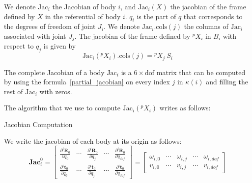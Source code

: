 We denote $\text{Jac}_i$ the Jacobian of body $i$, and $\text{Jac}_i(X)$ the jacobian of the frame defined by $X$ in the referential of body $i$.
$q_i$ is the part of $q$ that corresponds to the degrees of freedom of joint $J_i$.
We denote $\text{Jac}_i.\text{cols}(j)$ the columns of $\text{Jac}_i$ associated with joint $J_j$.
The jacobian of the frame defined by ${}^p X_i$ in $B_i$ with respect to $q_j$ is given by
\begin{equation}
\label{partial_jacobian}
  \text{Jac}_i({}^p X_i).\text{cols}(j) = {}^p X_j\ S_i
\end{equation}

The complete Jacobian of a body $\text{Jac}_i$ is a $6\times \text{dof}$ matrix that can be computed by using the formula~\ref{partial_jacobian} on every index $j$ in $\kappa(i)$ and filling the rest of $\text{Jac}_i$ with zeros.

The algorithm that we use to compute $\text{Jac}_i({}{}^p X_i)$ writes as follows:

\begin{algorithm}
  \caption{Jacobian Computation}
\label{alg:jacobian_computation}
\begin{algorithmic}
  \EndFor{}
\end{algorithmic}
\end{algorithm}

We write the jacobian of each body at its origin as follows:
\begin{equation}
  \mathbf{Jac}^0_i =
  \begin{bmatrix}
    \frac{\partial {}^i\mathbf{R}_0}{\partial q_0} & \cdots &
    \frac{\partial {}^i\mathbf{R}_0}{\partial q_j} & \cdots &
    \frac{\partial {}^i\mathbf{R}_0}{\partial q_{dof}} \\
    \frac{\partial {}^i\mathbf{t}_0}{\partial q_0} & \cdots &
    \frac{\partial {}^i\mathbf{t}_0}{\partial q_j} & \cdots &
    \frac{\partial {}^i\mathbf{t}_0}{\partial q_{dof}}
  \end{bmatrix}
=
  \begin{bmatrix}
    \omega_{i,0} & \cdots &
    \omega_{i,j} & \cdots &
    \omega_{i,dof} \\
    v_{i,0} & \cdots &
    v_{i,j} & \cdots &
    v_{i,dof}
  \end{bmatrix}
\end{equation}



